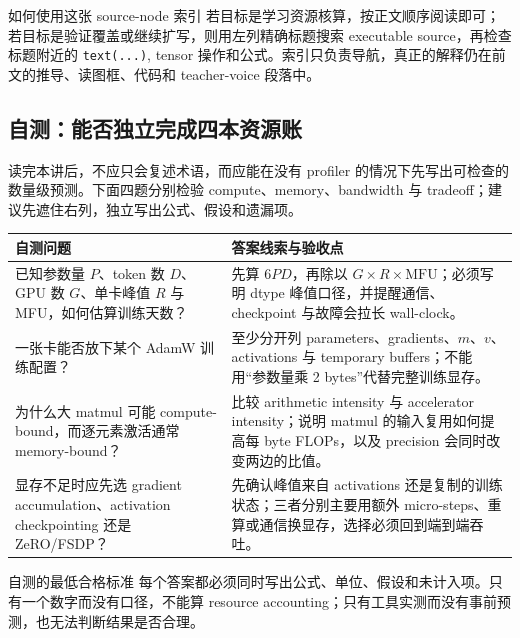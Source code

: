 \documentclass[a4paper]{article}
\begin{document}
\begin{knowledgebox}{如何使用这张 source-node 索引}
若目标是学习资源核算，按正文顺序阅读即可；若目标是验证覆盖或继续扩写，则用左列精确标题搜索 executable source，再检查标题附近的 \texttt{text(...)}, tensor 操作和公式。索引只负责导航，真正的解释仍在前文的推导、读图框、代码和 teacher-voice 段落中。
\end{knowledgebox}

\subsection{自测：能否独立完成四本资源账}

读完本讲后，不应只会复述术语，而应能在没有 profiler 的情况下先写出可检查的数量级预测。下面四题分别检验 compute、memory、bandwidth 与 tradeoff；建议先遮住右列，独立写出公式、假设和遗漏项。

\begin{longtable}{p{}p{}}
\toprule
\textbf{自测问题} & \textbf{答案线索与验收点} \\
\midrule
已知参数量 \(P\)、token 数 \(D\)、GPU 数 \(G\)、单卡峰值 \(R\) 与 MFU，如何估算训练天数？ & 先算 \(6PD\)，再除以 \(G\times R\times\mathrm{MFU}\)；必须写明 dtype 峰值口径，并提醒通信、checkpoint 与故障会拉长 wall-clock。 \\
一张卡能否放下某个 AdamW 训练配置？ & 至少分开列 parameters、gradients、\(m\)、\(v\)、activations 与 temporary buffers；不能用“参数量乘 2 bytes”代替完整训练显存。 \\
为什么大 matmul 可能 compute-bound，而逐元素激活通常 memory-bound？ & 比较 arithmetic intensity 与 accelerator intensity；说明 matmul 的输入复用如何提高每 byte FLOPs，以及 precision 会同时改变两边的比值。 \\
显存不足时应先选 gradient accumulation、activation checkpointing 还是 ZeRO/FSDP？ & 先确认峰值来自 activations 还是复制的训练状态；三者分别主要用额外 micro-steps、重算或通信换显存，选择必须回到端到端吞吐。 \\
\bottomrule
\end{longtable}

\begin{warningbox}{自测的最低合格标准}
每个答案都必须同时写出公式、单位、假设和未计入项。只有一个数字而没有口径，不能算 resource accounting；只有工具实测而没有事前预测，也无法判断结果是否合理。
\end{warningbox}
\end{document}
